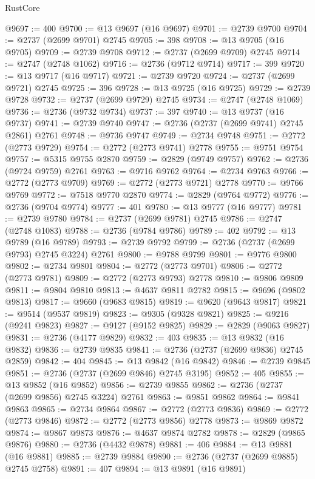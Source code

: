 \begin{lexlean}{RustCore}
\begin{coremodule}
@9697 := 400
@9700 := @13 @9697 (@16 @9697)
@9701 := @2739 @9700
@9704 := @2737 (@2699 @9701) @2745
@9705 := 398
@9708 := @13 @9705 (@16 @9705)
@9709 := @2739 @9708
@9712 := @2737 (@2699 @9709) @2745
@9714 := @2747 (@2748 @1062)
@9716 := @2736 (@9712 @9714)
@9717 := 399
@9720 := @13 @9717 (@16 @9717)
@9721 := @2739 @9720
@9724 := @2737 (@2699 @9721) @2745
@9725 := 396
@9728 := @13 @9725 (@16 @9725)
@9729 := @2739 @9728
@9732 := @2737 (@2699 @9729) @2745
@9734 := @2747 (@2748 @1069)
@9736 := @2736 (@9732 @9734)
@9737 := 397
@9740 := @13 @9737 (@16 @9737)
@9741 := @2739 @9740
@9747 := @2736 (@2737 (@2699 @9741) @2745 @2861) @2761
@9748 := @9736 @9747
@9749 := @2734 @9748
@9751 := @2772 (@2773 @9729)
@9754 := @2772 (@2773 @9741) @2778
@9755 := @9751 @9754
@9757 := @5315 @9755 @2870
@9759 := @2829 (@9749 @9757)
@9762 := @2736 (@9724 @9759) @2761
@9763 := @9716 @9762
@9764 := @2734 @9763
@9766 := @2772 (@2773 @9709)
@9769 := @2772 (@2773 @9721) @2778
@9770 := @9766 @9769
@9772 := @7518 @9770 @2870
@9774 := @2829 (@9764 @9772)
@9776 := @2736 (@9704 @9774)
@9777 := 401
@9780 := @13 @9777 (@16 @9777)
@9781 := @2739 @9780
@9784 := @2737 (@2699 @9781) @2745
@9786 := @2747 (@2748 @1083)
@9788 := @2736 (@9784 @9786)
@9789 := 402
@9792 := @13 @9789 (@16 @9789)
@9793 := @2739 @9792
@9799 := @2736 (@2737 (@2699 @9793) @2745 @3224) @2761
@9800 := @9788 @9799
@9801 := @9776 @9800
@9802 := @2734 @9801
@9804 := @2772 (@2773 @9701)
@9806 := @2772 (@2773 @9781)
@9809 := @2772 (@2773 @9793) @2778
@9810 := @9806 @9809
@9811 := @9804 @9810
@9813 := @4637 @9811 @2782
@9815 := @9696 (@9802 @9813)
@9817 := @9660 (@9683 @9815)
@9819 := @9620 (@9643 @9817)
@9821 := @9514 (@9537 @9819)
@9823 := @9305 (@9328 @9821)
@9825 := @9216 (@9241 @9823)
@9827 := @9127 (@9152 @9825)
@9829 := @2829 (@9063 @9827)
@9831 := @2736 (@4177 @9829)
@9832 := 403
@9835 := @13 @9832 (@16 @9832)
@9836 := @2739 @9835
@9841 := @2736 (@2737 (@2699 @9836) @2745 @2859)
@9842 := 404
@9845 := @13 @9842 (@16 @9842)
@9846 := @2739 @9845
@9851 := @2736 (@2737 (@2699 @9846) @2745 @3195)
@9852 := 405
@9855 := @13 @9852 (@16 @9852)
@9856 := @2739 @9855
@9862 := @2736 (@2737 (@2699 @9856) @2745 @3224) @2761
@9863 := @9851 @9862
@9864 := @9841 @9863
@9865 := @2734 @9864
@9867 := @2772 (@2773 @9836)
@9869 := @2772 (@2773 @9846)
@9872 := @2772 (@2773 @9856) @2778
@9873 := @9869 @9872
@9874 := @9867 @9873
@9876 := @4637 @9874 @2782
@9878 := @2829 (@9865 @9876)
@9880 := @2736 (@4432 @9878)
@9881 := 406
@9884 := @13 @9881 (@16 @9881)
@9885 := @2739 @9884
@9890 := @2736 (@2737 (@2699 @9885) @2745 @2758)
@9891 := 407
@9894 := @13 @9891 (@16 @9891)

\end{coremodule}
\end{lexlean}
